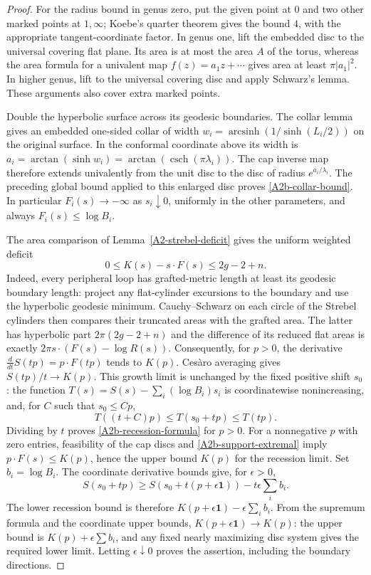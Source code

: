 \begin{proof}
For the radius bound in genus zero, put the given point at $0$ and two
other marked points at $1,\infty$; Koebe's quarter theorem gives the
bound $4$, with the appropriate tangent-coordinate factor. In genus one,
lift the embedded disc to the universal covering flat plane. Its area
is at most the area $A$ of the torus, whereas the area formula for a
univalent map $f(z)=a_1z+\cdots$ gives area at least $\pi|a_1|^2$.
In higher genus, lift to the universal covering disc and apply
Schwarz's lemma. These arguments also cover extra marked points.

Double the hyperbolic surface across its geodesic boundaries. The collar
lemma gives an embedded one-sided collar of width
$w_i=\operatorname{arcsinh}(1/\sinh(L_i/2))$ on the original surface.
In the conformal coordinate above its width is
$a_i=\arctan(\sinh w_i)=\arctan(\operatorname{csch}(\pi\lambda_i))$.
The cap inverse map therefore extends univalently from the unit disc
to the disc of radius $e^{a_i/\lambda_i}$. The preceding global bound
applied to this enlarged disc proves \eqref{A2b-collar-bound}.
In particular $F_i(s)\to-\infty$ as $s_i\downarrow0$, uniformly in
the other parameters, and always $F_i(s)\leq\log B_i$.

The area comparison of Lemma~\ref{A2-strebel-deficit} gives the uniform
weighted deficit
\[
 0\leq K(s)-s\cdot F(s)\leq 2g-2+n.
\]
Indeed, every peripheral loop has grafted-metric length at least its
geodesic boundary length: project any flat-cylinder excursions to the
boundary and use the hyperbolic geodesic minimum. Cauchy--Schwarz on
each circle of the Strebel cylinders then compares their truncated
areas with the grafted area. The latter has hyperbolic part
$2\pi(2g-2+n)$ and the difference of its reduced flat areas is exactly
$2\pi s\cdot(F(s)-\log R(s))$.
Consequently, for $p>0$, the derivative
$\frac{d}{dt}S(tp)=p\cdot F(tp)$ tends to $K(p)$.
Ces\`aro averaging gives $S(tp)/t\to K(p)$.
This growth limit is unchanged by the fixed positive shift $s_0$:
the function $T(s)=S(s)-\sum_i(\log B_i)s_i$ is coordinatewise
nonincreasing, and, for $C$ such that $s_0\leq Cp$,
\[
 T((t+C)p)\leq T(s_0+tp)\leq T(tp).
\]
Dividing by $t$ proves \eqref{A2b-recession-formula} for $p>0$.
For a nonnegative $p$ with zero entries, feasibility of the cap discs
and \eqref{A2b-support-extremal} imply
$p\cdot F(s)\leq K(p)$, hence the upper bound $K(p)$ for the
recession limit. Set $b_i=\log B_i$. The coordinate derivative bounds
give, for $\epsilon>0$,
\[
 S(s_0+tp)\geq S(s_0+t(p+\epsilon\mathbf1))
                       -t\epsilon\sum_i b_i.
\]
The lower recession bound is therefore
$K(p+\epsilon\mathbf1)-\epsilon\sum_i b_i$.
From the supremum formula and the coordinate upper bounds,
$K(p+\epsilon\mathbf1)\to K(p)$: the upper bound is
$K(p)+\epsilon\sum b_i$, and any fixed nearly maximizing disc system
gives the required lower limit. Letting $\epsilon\downarrow0$ proves
the assertion, including the boundary directions.
\end{proof}


